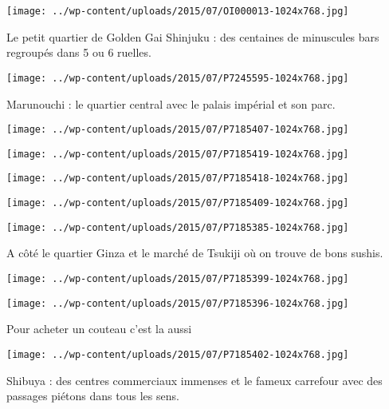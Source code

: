  \newline
 \newline
\centerline{\texttt{[image: ../wp-content/uploads/2015/07/OI000013-1024x768.jpg]} } 
 \newline
 Le petit quartier de Golden Gai Shinjuku : des centaines de minuscules bars regroupés dans 5 ou 6 ruelles. \newline
 \newline
\centerline{\texttt{[image: ../wp-content/uploads/2015/07/P7245595-1024x768.jpg]} } 
 \newline
 Marunouchi : le quartier central avec le palais impérial et son parc. \newline
 \newline
\centerline{\texttt{[image: ../wp-content/uploads/2015/07/P7185407-1024x768.jpg]} } 
 \newline
 \newline
\centerline{\texttt{[image: ../wp-content/uploads/2015/07/P7185419-1024x768.jpg]} } 
 \newline
 \newline
\centerline{\texttt{[image: ../wp-content/uploads/2015/07/P7185418-1024x768.jpg]} } 
 \newline
 \newline
\centerline{\texttt{[image: ../wp-content/uploads/2015/07/P7185409-1024x768.jpg]} } 
 \newline
 \newline
\centerline{\texttt{[image: ../wp-content/uploads/2015/07/P7185385-1024x768.jpg]} } 
 \newline
 A côté le quartier Ginza et le marché de Tsukiji où on trouve de bons sushis. \newline
 \newline
\centerline{\texttt{[image: ../wp-content/uploads/2015/07/P7185399-1024x768.jpg]} } 
 \newline
 \newline
\centerline{\texttt{[image: ../wp-content/uploads/2015/07/P7185396-1024x768.jpg]} } 
 \newline
 Pour acheter un couteau c'est la aussi \newline
 \newline
\centerline{\texttt{[image: ../wp-content/uploads/2015/07/P7185402-1024x768.jpg]} } 
 \newline
 Shibuya : des centres commerciaux immenses et le fameux carrefour avec des passages piétons dans tous les sens. \newline
